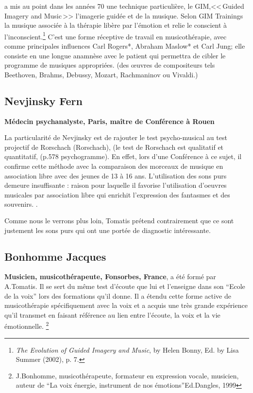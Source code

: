 a mis au point dans les années 70
une technique particulière, le GIM,<<\,Guided Imagery and Music\,>>
l'imagerie guidée et de la musique. Selon GIM
Trainings\autocite{gim_site} la
musique associée à la thérapie libère par l'émotion et relie le
conscient à l'inconscient.\footnote{\textsl{The Evolution of Guided Imagery and Music}, 
	by Helen Bonny, Ed. by Lisa Summer (2002), p. 7.}
 C'est une forme réceptive de travail
en musicothérapie, avec comme principales influences Carl Rogers*, Abraham Maslow* et Carl Jung; 
elle  consiste en une longue anamnèse avec le
patient qui permettra de cibler le programme de musiques appropriées. 
(des \oe uvres de compositeurs tels Beethoven, Brahms, Debussy,
Mozart, Rachmaninov ou Vivaldi.)






\subsection{ Nevjinsky Fern}
\textbf{Médecin psychanalyste, 
  Paris, maître de Conférence à Rouen}

 La particularité de Nevjinsky est de rajouter le test psycho-musical
 au test projectif de Rorschach (\gls{Rorschach}), (le test de
 Rorschach est qualitatif et quantitatif, (p.578 psychogramme).
 En effet, lors d'une
 Conférence à ce sujet, il confirme cette méthode 
 avec la comparaison des morceaux de musique en association libre avec
 des jeunes de 13 à 16 ans. 
 L'utilisation des sons purs demeure insuffisante : raison pour
 laquelle il favorise l'utilisation d'oeuvres musicales par
 association libre qui enrichit l'expression des fantasmes et des
 souvenirs.
\autocite[Fern Nevjinsky, maître de conférences à l'Université de Rouen, musicien, psycho-analyste. 
``\textit{Comparaison des modalités de projection et d'expression au test de Rorschach et à un test psycho-musical pour des adolescents de 13 à 16 ans}''.]{nevjinsky:adolescence}.  

 Comme nous le verrons plus loin, Tomatis prétend contrairement que ce sont justement les sons purs
qui ont une portée de diagnostic intéressante.

  \subsection{ Bonhomme Jacques } 
  \textbf{Musicien, musicothérapeute,
    Fonsorbes, France}, a été formé par A.Tomatis. Il se sert du même test d'écoute
      que lui et l'enseigne dans son ``Ecole de la voix'' lors des
      formations qu'il donne. Il a étendu cette  forme active de musicothérapie
      spécifiquement avec la voix 
     et a acquis une
      très grande expérience qu'il transmet en   
      faisant référence au lien entre l'écoute, la voix et la vie émotionnelle. \footnote{J.Bonhomme, musicothérapeute, formateur 
  	en expression vocale, musicien, auteur de ``La voix énergie,
        instrument de nos émotions''Ed.Dangles, 1999}

